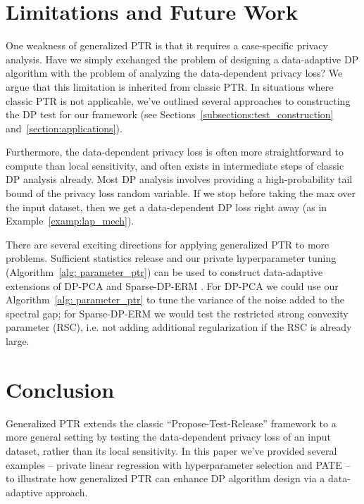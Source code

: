 \section{Limitations and Future Work}
One weakness of generalized PTR is that it requires a case-specific privacy analysis. Have we simply exchanged the problem of designing a data-adaptive DP algorithm with the problem of analyzing the data-dependent privacy loss? We argue that this limitation is inherited from classic PTR. In situations where classic PTR is not applicable, we've outlined several approaches to constructing the DP test for our framework (see Sections~\ref{subsections:test_construction} and~\ref{section:applications}).

Furthermore, the data-dependent privacy loss is often more straightforward to compute than local sensitivity, and often exists in intermediate steps of classic DP analysis already. Most DP analysis involves providing a high-probability tail bound of the privacy loss random variable. If we stop before taking the max over the input dataset, then we get a data-dependent DP loss right away (as in Example~\ref{examp:lap_mech}).

There are several exciting directions for applying generalized PTR to more problems. Sufficient statistics release and our private hyperparameter tuning (Algorithm~\ref{alg: parameter_ptr}) can be used to construct data-adaptive extensions of DP-PCA \citep{dwork2014analyze} and Sparse-DP-ERM \citep{kifer2012private}. For DP-PCA we could use our Algorithm~\ref{alg: parameter_ptr} to tune the variance of the noise added to the spectral gap; for Sparse-DP-ERM we would test the restricted strong convexity parameter (RSC), i.e. not adding additional regularization if the RSC is already large.


\section{Conclusion}

Generalized PTR extends the classic ``Propose-Test-Release'' framework to a more general setting by testing the data-dependent privacy loss of an input dataset, rather than its local sensitivity. In this paper we've provided several examples -- private linear regression with hyperparameter selection and PATE -- to illustrate how generalized PTR can enhance DP algorithm design via a data-adaptive approach.